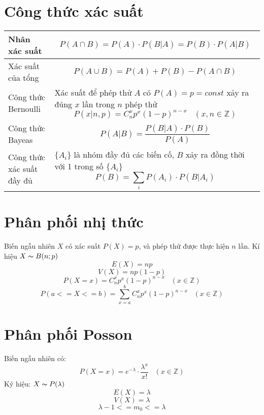 \documentclass[utf8,a4paper]{article}
\begin{document}
\section[]{Công thức xác suất}
\begin{center}
    \begin{tabularx}{11.9cm} { 
        | >{\centering\arraybackslash} m{3cm}
        | >{\centering\arraybackslash} m{8cm} | }
        \hline
            Nhân xác suất &
            \[P(A \cap B) = P(A) \cdot P(B | A) = P(B) \cdot P(A | B)\] \\
        \hline
            Xác suất của tổng&
            \[P(A \cup B) = P(A) + P(B) - P(A \cap B)\]\\
        \hline
            Công thức Bernoulli &
            Xác suất để phép thử \(A\) có \(P(A) = p = const\) xảy ra đúng \(x\) lần trong \(n\) phép thử
            \[P(x | n, p) = {C}^{x}_{n}{p}^{x}{(1 - p)}^{n - x} \;\;\; (x,n \in \mathbb{Z})\] \\
        \hline
            Công thức Bayeas & 
            \[P(A | B) = \frac{P(B | A) \cdot P(B)}{P(A)}\] \\
        \hline
            Công thức xác suất đầy đủ & 
            \(\{{A}_{i}\}\) là nhóm đầy đủ các biến cố, \(B\) xảy ra đồng thời với 1 trong số \(\{{A}_{i}\}\)
            \[P(B) = {\sum}_{i}{P({A}_{i}) \cdot P(B | {A}_{i})}\] \\
        \hline
    \end{tabularx}
\end{center}

\section[]{Phân phối nhị thức}
Biến ngẫu nhiên \(X\) có xác suất \(P(X) = p\), và phép thử được thực hiện \(n\) lần. Kí hiệu \(X \thicksim B(n; p)\)
\[E(X) = np\] 
\[V(X) = np(1 - p)\] 
\[P(X = x) = {C}^{x}_{n}{p}^{x}{(1 - p)}^{n - x} \;\;\; (x \in \mathbb{Z})\]
\[P(a <= X <= b) = {\sum}^{b}_{x = a}{{C}^{x}_{n}{p}^{x}{(1 - p)}^{n - x}} \;\;\; (x \in \mathbb{Z})\]

\section[]{Phân phối Posson}
Biến ngẫu nhiên có:
\[P(X = x) = {e}^{- \lambda} \cdot \frac{{\lambda}^{x}}{x!} \;\;\; (x \in \mathbb{Z})\]
Ký hiệu: \(X \thicksim P(\lambda)\)
\[E(X) = \lambda\] 
\[V(X) = \lambda\] 
\[\lambda - 1 <= {m}_{0} <= \lambda\]
\end{document}
